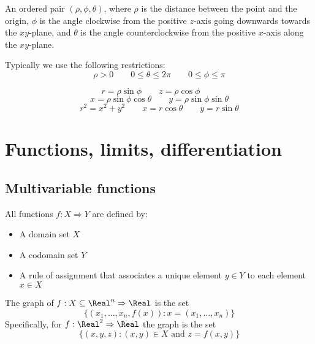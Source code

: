 \begin{definition}
  An ordered pair $(\rho, \phi, \theta)$, where $\rho$ is the distance between the point and the origin, $\phi$ is the angle clockwise from the positive $z$-axis going downwards towards the $xy$-plane, and $\theta$ is the angle counterclockwise from the positive $x$-axis along the $xy$-plane.

  Typically we use the following restrictions:
  \[
    \rho > 0 \qquad 0 \leq \theta \leq 2\pi \qquad 0 \leq \phi \leq \pi
  \]
\end{definition}

\begin{theorem}
  \[
    r = \rho \sin \phi \qquad z = \rho \cos \phi \qquad
  \]\[
    x = \rho \sin \phi \cos \theta \qquad y = \rho \sin \phi \sin \theta
  \]\[
    r^2 = x^2 + y^2 \qquad x = r \cos \theta \qquad y = r \sin \theta
  \]
\end{theorem}

\section{Functions, limits, differentiation}

\subsection{Multivariable functions}


\begin{definition}[Function]
  All functions $f : X \Rightarrow Y$ are defined by:
  \begin{itemize}
    \item A domain set $X$
    \item A codomain set $Y$
    \item A rule of assignment that associates a unique element $y \in Y$ to each element $x \in X$
  \end{itemize}
\end{definition}

\begin{definition}[Graph]
  The graph of $f : X \subseteq \Real^n \Rightarrow \Real$ is the set
  \[
    \{(x_1, \ldots, x_n, f(x)) : x = (x_1, \ldots, x_n)\}
  \]
  Specifically, for $f : \Real^2 \Rightarrow \Real$ the graph is the set
  \[
    \{(x, y, z) : (x, y) \in X \text{ and } z = f(x, y)\}
  \]
\end{definition}

